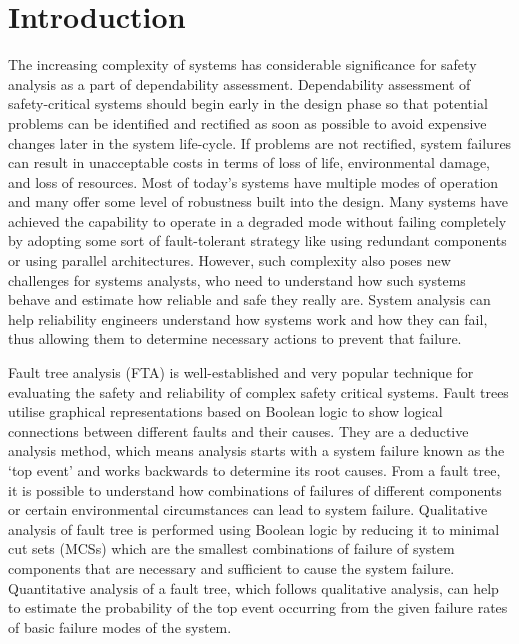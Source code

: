 \documentclass[10pt]{llncs}
\begin{document}
\section{Introduction}
\label{sec:1}
The increasing complexity of systems has considerable significance for safety analysis as a part of dependability assessment. Dependability assessment of safety-critical
systems should begin early in the design phase so that potential problems can be identified and rectified as soon as possible to avoid expensive changes later in the system life-cycle. If problems are not rectified, system failures can result in unacceptable costs in terms of loss of life, environmental damage, and loss of resources\cite{Bernardi2007}. Most of today's systems have multiple modes of operation and many offer some level of robustness built into the design. Many systems have achieved the capability to operate in a degraded mode without failing completely by adopting some sort of fault-tolerant strategy like using redundant components or using parallel architectures. However, such complexity also poses new challenges for systems analysts, who need to understand how such systems behave and estimate how reliable and safe they really are. System analysis can help reliability engineers understand how systems work and how they can fail, thus allowing them to determine necessary actions to prevent that failure\cite{Martin2009}.

Fault tree analysis (FTA) is well-established and very popular technique for evaluating the safety  and  reliability of complex safety critical systems\cite{Leveson1995}. Fault  trees  utilise  graphical representations  based  on  Boolean  logic  to  show  logical connections  between  different  faults  and  their  causes. They are  a deductive analysis method, which means analysis starts  with  a  system  failure  known  as  the  `top  event'  and works  backwards  to  determine  its  root  causes\cite{Vesely2002}.  From  a  fault tree, it is possible to understand how combinations of failures of  different  components  or  certain  environmental 
circumstances can lead to system failure. Qualitative analysis of  fault tree is performed using Boolean logic by reducing it to minimal cut sets (MCSs) which are the smallest combinations of failure of system components that are necessary and sufficient to cause the system failure. Quantitative  analysis  of  a fault  tree,  which  follows  qualitative  analysis,  can  help  to estimate  the  probability  of  the  top  event  occurring  from  the given failure rates of basic failure modes of the system\cite{Vesely1981}.
\end{document}

